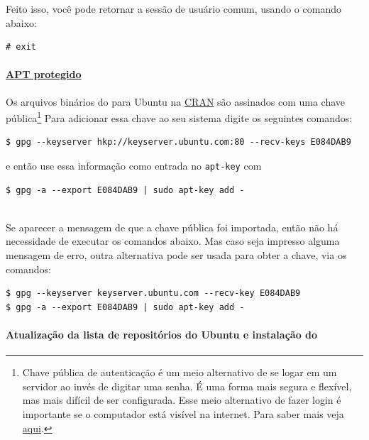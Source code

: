 \documentclass[]{book}
\let\oldparagraph\paragraph
\renewcommand{\paragraph}[1]{\oldparagraph{#1}\mbox{}}
\let\rmarkdownfootnote\footnote%
\def\footnote{\protect\rmarkdownfootnote}
\begin{document}
Feito isso, você pode retornar a sessão de usuário comum, usando o
comando abaixo:

\begin{verbatim}
# exit
\end{verbatim}

\paragraph{\texorpdfstring{\href{https://cran.r-project.org/bin/linux/ubuntu/README.html\#secure-apt}{APT
protegido}}{APT protegido}}\label{apt-protegido}

Os arquivos binários do para Ubuntu na
\href{http://cran.r-project.org}{CRAN} são assinados com uma chave
pública\footnote{Chave pública de autenticação é um meio alternativo de
  se logar em um servidor ao invés de digitar uma senha. É uma forma
  mais segura e flexível, mas mais difícil de ser configurada. Esse meio
  alternativo de fazer login é importante se o computador está visível
  na internet. Para saber mais veja
  \href{http://the.earth.li/~sgtatham/putty/0.55/htmldoc/Chapter8.html}{aqui}.}
Para adicionar essa chave ao seu sistema digite os seguintes comandos:

\begin{verbatim}
$ gpg --keyserver hkp://keyserver.ubuntu.com:80 --recv-keys E084DAB9
\end{verbatim}

e então use essa informação como entrada no \texttt{apt-key} com

\begin{verbatim}
$ gpg -a --export E084DAB9 | sudo apt-key add -
  
\end{verbatim}

Se aparecer a mensagem de que a chave pública foi importada, então não
há necessidade de executar os comandos abaixo. Mas caso seja impresso
alguma mensagem de erro, outra alternativa pode ser usada para obter a
chave, via os comandos:

\begin{verbatim}
$ gpg --keyserver keyserver.ubuntu.com --recv-key E084DAB9
$ gpg -a --export E084DAB9 | sudo apt-key add -
\end{verbatim}

\paragraph{Atualização da lista de repositórios do Ubuntu e instalação
do
}\label{atualizacao-da-lista-de-repositorios-do-ubuntu-e-instalacao-do}
\end{document}
